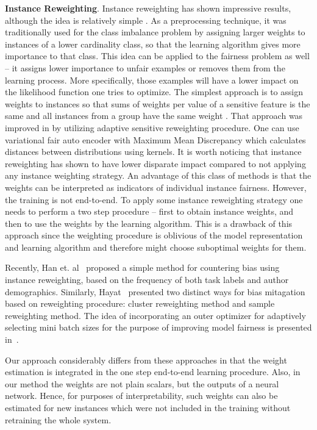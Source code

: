 \documentclass[preprint,12pt]{elsarticle}
\begin{document}
\textbf{Instance Reweighting}. Instance reweighting has shown impressive results, although the idea is relatively simple \cite{feldman2015certifying, krasanakis2018adaptive, ren2018learning, shu2019meta, jiang2018mentornet}. As a preprocessing technique, it was traditionally used for the class imbalance problem by assigning larger weights to instances of a  lower cardinality class, so that the learning algorithm gives more importance to that class. This idea can be applied to the fairness problem as well -- it assigns lower importance to unfair examples or removes them from the learning process. More specifically, those examples will have a lower impact on the likelihood function one tries to optimize.
The simplest approach is to assign weights to instances so that sums of weights per value of a  sensitive feature is the same and all instances from a group have the same weight \cite{kamiran2012data}. That approach was improved in \cite{krasanakis2018adaptive} by utilizing adaptive sensitive reweighting procedure. One can use variational fair auto encoder with Maximum Mean Discrepancy \cite{louizos2015variational} which calculates distances between distributions using kernels. It is worth noticing that instance reweighting has shown to have lower disparate impact \cite{feldman2015certifying} compared to not applying any instance weighting strategy. An advantage of this class of methods is that the weights can be interpreted as indicators of individual instance fairness. However, the training is not end-to-end. To apply some instance reweighting strategy one needs to perform a two step procedure -- first to obtain instance weights, and then to use the weights by the learning algorithm. This is a drawback of this approach since the weighting procedure is oblivious of the model representation and learning algorithm and therefore might choose suboptimal weights for them. 

Recently, Han et. al~\cite{han2021balancing} proposed a simple method for countering bias using instance reweighting, based on the frequency of both task labels and author demographics. Similarly, Hayat~\cite{hayat2021towards} presented two distinct ways for bias mitagation based on reweighting procedure: cluster reweighting method and sample reweighting method. The idea of incorporating an outer optimizer for adaptively selecting mini batch sizes for the purpose of improving model fairness is presented in~\cite{roh2020fairbatch}.

Our approach considerably differs from these approaches in that the weight estimation is integrated in the one step end-to-end learning procedure. Also, in our method the weights are not plain scalars, but the outputs of a neural network. Hence, for purposes of interpretability, such weights can also be estimated for new instances which were not included in the training without retraining the whole system.
\end{document}
